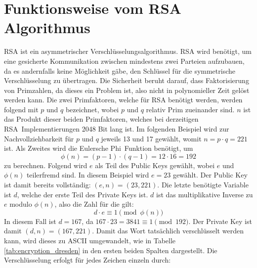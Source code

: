 \section{Funktionsweise vom RSA Algorithmus}
RSA ist ein asymmetrischer Verschlüsselungsalgorithmus.
RSA wird benötigt, um eine gesicherte Kommunikation zwischen mindestens zwei Parteien aufzubauen, da 
es andernfalls keine Möglichkeit gäbe, den Schlüssel für die symmetrische Verschlüsselung  zu übertragen.
Die Sicherheit beruht darauf, dass Faktorisierung von Primzahlen, da dieses ein  Problem ist\cite{moolchad_leveraging_nodate},
also nicht in polynomieller Zeit gelöst werden kann. Die zwei Primfaktoren, welche für RSA benötigt werden, 
werden folgend mit $p$ und $q$ bezeichnet, wobei $p$ und $q$ relativ Prim zueinander sind. 
$n$ ist das Produkt dieser beiden Primfaktoren, welches bei derzeitigen RSA\textendash\ Implementierungen 
2048 Bit lang ist. Im folgenden Beispiel wird zur Nachvollziehbarkeit für $p$ und $q$ jeweils 13 und 17 gewählt, womit
$n = p \cdot q = 221$ ist. Als Zweites wird die Eulersche Phi\textendash\ Funktion benötigt, um 
\[
\phi(n) = (p-1) \cdot (q-1) = 12 \cdot 16 = 192
\]
zu berechnen. Folgend wird $e$ als Teil des Public Keys gewählt, wobei $e$ und $\phi(n)$ teilerfremd sind. In diesem 
Beispiel wird $e = 23$ gewählt. Der Public Key ist damit bereits vollständig: $(e, n) = (23, 221)$. Die letzte benötigte
Variable ist $d$, welche der erste Teil des Private Keys ist. $d$ ist das multiplikative Inverse zu $e$ modulo $\phi(n)$,
also die Zahl für die gilt:
\[
d \cdot e \equiv 1 \pmod{\phi(n)}
\]
In diesem Fall ist $d = 167$, da $167 \cdot 23 = 3841 \equiv 1 \pmod{192}$. Der Private Key ist damit $(d, n) = (167, 221)$.
Damit das Wort  tatsächlich verschlüsselt werden kann, wird dieses zu ASCII umgewandelt, wie in 
Tabelle \ref{tab:encryption_dresden} in den ersten beiden Spalten dargestellt.
Die Verschlüsselung erfolgt für jedes Zeichen einzeln durch:
